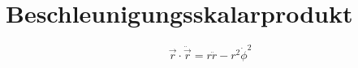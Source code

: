 \section{Beschleunigungsskalarprodukt}
\[
\vec{r} \cdot \ddot{\vec{r}} = r\ddot{r} - r^2\dot{\phi}^2
\]